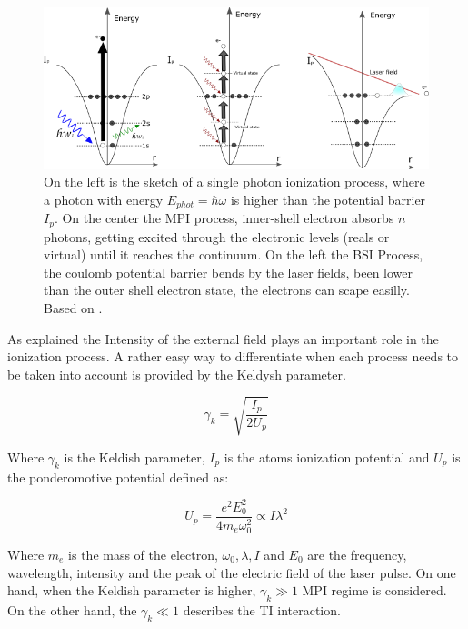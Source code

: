 \begin{figure}[h!]

\centering
\includegraphics[width = 14 cm]{../Images/photoionization2.png}
\caption[Ionization regimes]{ On the left is the sketch of a single photon ionization process, where a photon with energy $E_{phot} = \hbar\omega$ is higher than the potential barrier $I_{p}$. On the center the MPI process, inner-shell electron absorbs $n$ photons, getting excited through the electronic levels (reals or virtual) until it reaches the continuum. On the left the BSI Process, the coulomb potential barrier bends by the laser fields, been lower than the outer shell electron state, the electrons can scape easilly. Based on \cite{rafipoor_two-color_2017}.}
\label{img:ionizationprocess}
\end{figure}


As explained the Intensity of the external field plays an important role in the ionization process. A rather easy way to differentiate when each process needs to be taken into account is provided by the Keldysh parameter\cite{keldysh_ionization_1965}.

\begin{equation}
\gamma_{k}=\sqrt{\dfrac{I_{p}}{2U_{p}}}
\end{equation}

Where $\gamma_{k}$ is the Keldish parameter, $I_{p}$ is the atoms ionization potential and $U_{p}$ is the ponderomotive potential defined as:

\begin{equation}
U_{p} = \dfrac{e^{2}E_{0}^{2}}{4m_{e}\omega_{0}^{2}} \propto I \lambda^{2}
\end{equation}

Where $m_{e}$ is the mass of the electron, $\omega_{0}, \lambda, I$ and $E_{0}$ are the frequency, wavelength, intensity and the peak of the electric field of the laser pulse. On one hand, when the Keldish parameter is higher, $\gamma_{k} \gg 1$ MPI regime is considered. On the other hand, the $\gamma_{k} \ll 1$ describes the TI interaction.

